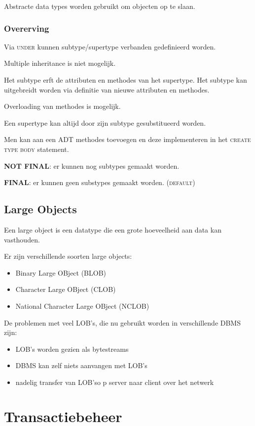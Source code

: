 \documentclass[a4paper,12pt]{article}
\begin{document}
Abstracte data types worden gebruikt om objecten op te slaan.

\subsubsection{Overerving}
Via \textsc{under} kunnen subtype/supertype verbanden gedefinieerd worden.

Multiple inheritance is niet mogelijk.

Het subtype erft de attributen en methodes van het supertype.
Het subtype kan uitgebreidt worden via definitie van nieuwe attributen en methodes.

Overloading van methodes is mogelijk.

Een supertype kan altijd door zijn subtype gesubstitueerd worden.

Men kan aan een \textsc{ADT} methodes toevoegen en deze implementeren in het \textsc{create type body} statement.

\textbf{NOT FINAL}: er kunnen nog subtypes gemaakt worden.

\textbf{FINAL}: er kunnen geen substypes gemaakt worden. (\textsc{default})

\subsection{Large Objects}
Een large object is een datatype die een grote hoeveelheid aan data kan vasthouden.

Er zijn verschillende soorten large objects:
\begin{itemize}
\item Binary Large OBject (BLOB)
\item Character Large OBject (CLOB)
\item National Character Large OBject (NCLOB)
\end{itemize}

De problemen met veel LOB's, die nu gebruikt worden in verschillende DBMS zijn:
\begin{itemize}
\item LOB's worden gezien als bytestreams
\item DBMS kan zelf niets aanvangen met LOB's
\item nadelig transfer van LOB'so p server naar client over het netwerk
\end{itemize}

\section{Transactiebeheer}
\end{document}
